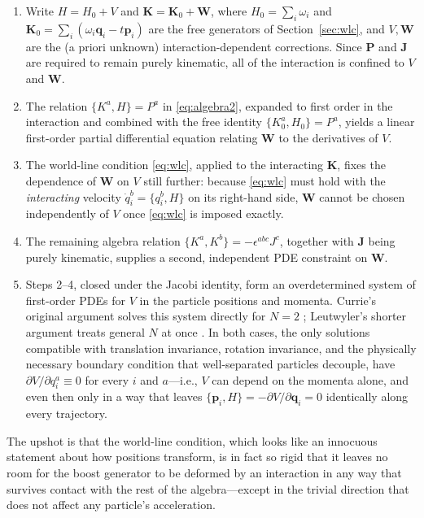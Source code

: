 \documentclass[11pt]{article}
\newcommand{\pb}[2]{\{#1,#2\}}
\newcommand{\bq}{\mathbf{q}}
\newcommand{\bp}{\mathbf{p}}
\newcommand{\bK}{\mathbf{K}}
\newcommand{\bJ}{\mathbf{J}}
\newcommand{\bP}{\mathbf{P}}
\newcommand{\bW}{\mathbf{W}}
\begin{document}
\begin{enumerate}[leftmargin=2em]
\item Write $H=H_0+V$ and $\bK=\bK_0+\bW$, where $H_0=\sum_i\omega_i$ and $\bK_0=\sum_i(\omega_i\bq_i-t\bp_i)$ are the free generators of Section~\ref{sec:wlc}, and $V,\bW$ are the (a priori unknown) interaction-dependent corrections. Since $\bP$ and $\bJ$ are required to remain purely kinematic, all of the interaction is confined to $V$ and $\bW$.
\item The relation $\pb{K^a}{H}=P^a$ in \eqref{eq:algebra2}, expanded to first order in the interaction and combined with the free identity $\pb{K_0^a}{H_0}=P^a$, yields a linear first-order partial differential equation relating $\bW$ to the derivatives of $V$.
\item The world-line condition \eqref{eq:wlc}, applied to the interacting $\bK$, fixes the dependence of $\bW$ on $V$ still further: because \eqref{eq:wlc} must hold with the \emph{interacting} velocity $\dot q_i^b=\pb{q_i^b}{H}$ on its right-hand side, $\bW$ cannot be chosen independently of $V$ once \eqref{eq:wlc} is imposed exactly.
\item The remaining algebra relation $\pb{K^a}{K^b}=-\epsilon^{abc}J^c$, together with $\bJ$ being purely kinematic, supplies a second, independent PDE constraint on $\bW$.
\item Steps 2--4, closed under the Jacobi identity, form an overdetermined system of first-order PDEs for $V$ in the particle positions and momenta. Currie's original argument solves this system directly for $N=2$ \cite{Currie1963}; Leutwyler's shorter argument treats general $N$ at once \cite{Leutwyler1965}. In both cases, the only solutions compatible with translation invariance, rotation invariance, and the physically necessary boundary condition that well-separated particles decouple, have $\partial V/\partial q_i^a\equiv 0$ for every $i$ and $a$---i.e., $V$ can depend on the momenta alone, and even then only in a way that leaves $\pb{\bp_i}{H}=-\partial V/\partial\bq_i=0$ identically along every trajectory.
\end{enumerate}

The upshot is that the world-line condition, which looks like an innocuous statement about how positions transform, is in fact so rigid that it leaves no room for the boost generator to be deformed by an interaction in any way that survives contact with the rest of the algebra---except in the trivial direction that does not affect any particle's acceleration.
\end{document}
